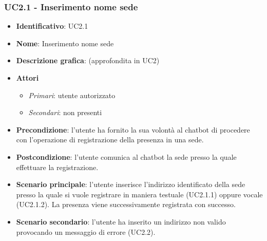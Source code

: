 \subsubsection{UC2.1 - Inserimento nome sede}
\begin{itemize}
    \item \textbf{Identificativo}: UC2.1
    \item \textbf{Nome}: Inserimento nome sede
    \item \textbf{Descrizione grafica}: (approfondita in UC2)
    \item \textbf{Attori}
 \begin{itemize} 
    \item \textit{Primari}: utente autorizzato
    \item \textit{Secondari}: non presenti
 \end{itemize}
 \item \textbf{Precondizione}: l'utente ha fornito la sua volontà al chatbot di procedere con l'operazione di registrazione della presenza in una sede.
 \item \textbf{Postcondizione}: l'utente comunica al chatbot la sede presso la quale effettuare la registrazione.
 \item \textbf{Scenario principale}: l'utente inserisce l'indirizzo identificato della sede presso la quale si vuole registrare in maniera testuale (UC2.1.1) oppure vocale (UC2.1.2). La presenza viene successivamente registrata con successo. 
 \item \textbf{Scenario secondario}: l'utente ha inserito un indirizzo non valido provocando un messaggio di errore (UC2.2). 
\end{itemize}

